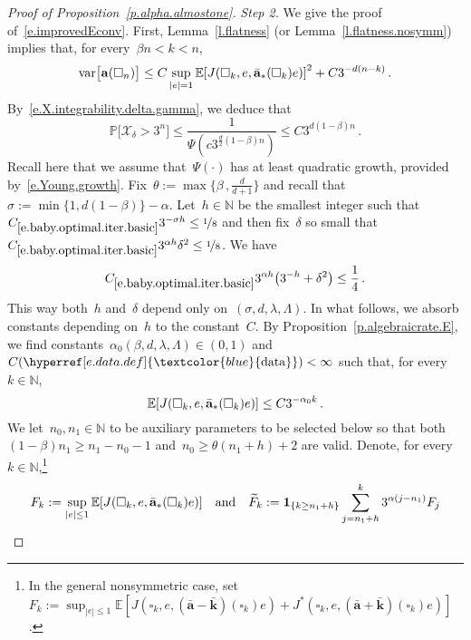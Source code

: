 \documentclass[11pt,twoside]{article} %
\let\oldsquare\square %
\renewcommand{\square}{\oldsquare}
\numberwithin{equation}{section}
\theoremstyle{definition}
\newcommand{\dataref}{\hyperref[e.data.def]{\textcolor{blue}{\ensuremath{\mathrm{data}}}}}
\let\originalleft\left
\let\originalright\right
\renewcommand{\left}{\mathopen{}\mathclose\bgroup\originalleft}
\renewcommand{\right}{\aftergroup\egroup\originalright}
\newcommand*{\N}{\ensuremath{\mathbb{N}}}
\renewcommand*{\tilde}{\widetilde}
\newcommand{\qand}{\quad \mbox{and} \quad }
\renewcommand{\a}{\mathbf{a}}
\newcommand{\ahom}{\bar{\a}}
\newcommand{\khom}{\bar{\mathbf{k}}}
\newcommand{\cu}{\square}
\renewcommand{\P}{\mathbb{P}}
\newcommand{\E}{\mathbb{E}}
\newcommand{\X}{\mathcal{X}}
\newcommand{\indc}{\boldsymbol{1}}
\DeclareMathOperator{\var}{var}
\begin{document}
\begin{proof}[{Proof of Proposition~\ref{p.alpha.almostone}}]
\smallskip


\emph{Step 2.}  We give the proof of~\eqref{e.improvedEconv}. First, Lemma~\ref{l.flatness} (or Lemma~\ref{l.flatness.nosymm}) implies that, for every~$\beta n < k < n$, 
\begin{equation}
\label{e.baby.optimal.variance.pre}
\var \bigl[  \a(\cu_{n}) \bigr] 
\leq
C
\sup_{|e|=1}
\E \left[ J(\cu_{k},e, \ahom_*(\cu_{k})  e) \right]^2
+
C
3^{-d(n-k)}
\,.
\end{equation}
By~\eqref{e.X.integrability.delta.gamma}, we deduce that
\begin{equation} 
\label{e.baby.optimal.minscale.pre}
\P\bigl[\X_\delta > 3^n \bigr] 
\leq \frac1 {\Psi(c 3^{\frac d2(1-\beta) n}) }  
\leq C 3^{d(1-\beta) n}
\,.
\end{equation}
Recall here that we assume that~$\Psi(\cdot)$ has at least quadratic growth, provided by~\eqref{e.Young.growth}. 
Fix~$\theta := \max\{ \beta \,, \frac{d}{d+1} \} $ and recall that~$\sigma := \min\{1,d(1-\beta) \} - \alpha$. Let~$h \in \N$ be the smallest integer such that~$C_{\eqref{e.baby.optimal.iter.basic}}  3^{-\sigma h} \leq \nicefrac18$ and then fix~$\delta$ so small that~$C_{\eqref{e.baby.optimal.iter.basic}} 3^{\alpha h} \delta^2 \leq \nicefrac18$. We have
\begin{equation} 
\label{e.baby.optimal.h.pre}
C_{\eqref{e.baby.optimal.iter.basic}} 3^{\alpha h} \bigl( 3^{-h} + \delta^2 \bigr) \leq \frac14
\,.
\end{equation} 
This way both~$h$ and~$\delta$ depend only on~$(\sigma,d,\lambda,\Lambda)$. In what follows, we absorb constants depending on~$h$ to the constant~$C$. By Proposition~\ref{p.algebraicrate.E}, we find constants~$\alpha_0(\beta,d,\lambda,\Lambda) \in (0,1)$ and~$C(\dataref)<\infty$ such that, for every~$k\in\N$, 
\begin{equation} 
\label{e.baby.optimal.iter.init}
\E \left[ J(\cu_{k},e, \ahom_*(\cu_{k})  e) \right] \leq C 3^{-\alpha_0 k }
\,.
\end{equation}
We let~$n_0,n_1 \in \N$ to be auxiliary parameters to be selected below so that both~$(1-\beta)n_1 \geq n_1 - n_0-1$ and~$n_0 \geq \theta(n_1+h)+2$ are valid. Denote, for every~$k \in \N$,\footnote{In the general nonsymmetric case, set~$F_k:=\sup_{|e| \leq 1} \E [ J(\cu_{k},e, (\ahom -\khom)(\cu_{k})  e)+ J^*(\cu_{k},e, (\ahom +\khom)(\cu_{k})  e)]$.} 
\begin{equation*} 
F_k := \sup_{|e| \leq 1}\E \left[ J(\cu_{k},e, \ahom_*(\cu_{k})  e) \right]
\qand
\tilde F_k := \indc_{\{k \geq n_1+h\}}\sum_{j=n_1+h}^k 3^{\alpha(j-n_1)} F_j 

\end{equation*}
\end{proof}
\end{document}
